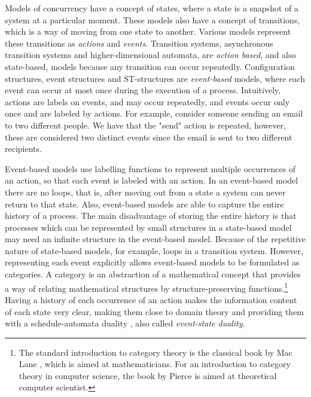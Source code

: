     Models of concurrency have a concept of states, where a state is a snapshot of a system at a particular moment. These models also have a concept of transitions, which is a way of moving from one state to another. Various models represent these transitions as \emph{actions} and \emph{events}. Transition systems, asynchronous transition systems and higher-dimensional automata, are \emph{action based}, and also state-based, models because any transition can occur repeatedly. Configuration structures, event structures and ST-structures are \emph{event-based} models, where each event can occur at most once during the execution of a process. Intuitively, actions are labels on events, and may occur repeatedly, and events occur only once and are labeled by actions. For example, consider someone sending an email to two different people. We have that the "send" action is repeated, however, these are considered two distinct events since the email is sent to two different recipients.
    
    Event-based models use labelling functions to represent multiple occurrences of an action, so that each event is labeled with an action. In an event-based model there are no loops, that is, after moving out from a state a system can never return to that state. Also, event-based models are able to capture the entire history of a process. The main disadvantage of storing the entire history is that processes which can be represented by small structures in a state-based model may need an infinite structure in the event-based model. Because of the repetitive nature of state-based models, for example, loops in a transition system. However, representing each event explicitly allows event-based models to be formulated as categories. A category is an abstraction of a mathematical concept that provides a way of relating mathematical structures by structure-preserving functions.\footnote{The standard introduction to category theory is the classical book by Mac Lane \cite{CategoryTheory71Mathematician}, which is aimed at mathematicians. For an introduction to category theory in computer science, the book by Pierce \cite{CategoryTheory91ComputerScientist} is aimed at theoretical computer scientist.} Having a history of each occurrence of an action makes the information content of each state very clear, making them close to domain theory and providing them with a schedule-automata duality \cite{NielsenPW81eventstructures, GlabbeekP09configStruct}, also called \emph{event-state duality}. 
   
